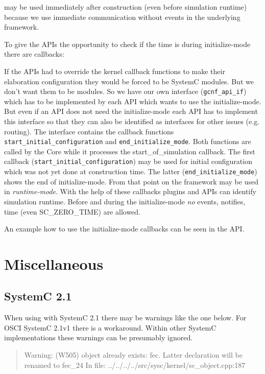 \GreenControl may be used immediately after construction (even before simulation runtime) because we use immediate communication without events in the underlying \GreenBus framework.

To give the APIs the opportunity to check if the time is during initialize-mode there are callbacks:

If the APIs had to override the kernel callback functions to make their elaboration configuration
they would be forced to be SystemC modules. But we don't want them to be modules. So we have our own
interface (\lstinline|gcnf_api_if|) which has to be implemented by each API which wants to use the
initialize-mode. But even if an API does not need the initialize-mode each API has to implement this interface so that they can also be identified as interfaces for other issues (e.g. routing). The interface contains the callback functions
\lstinline|start_initial_configuration| and \lstinline|end_initialize_mode|. Both functions are called by the Core while it processes the start\_of\_simulation callback. The first callback (\lstinline|start_initial_configuration|) may be used for initial configuration which was not yet done at construction time. The latter (\lstinline|end_initialize_mode|) shows the end of initialize-mode. From that point on the framework may be used in {\em runtime-mode}. With the help of these callbacks plugins and APIs can identify simulation runtime. Before and during the initialize-mode {\em no} events, notifies, time (even SC\_ZERO\_TIME) are allowed.

An example how to use the initialize-mode callbacks can be seen in the \GreenConfig API.


\section{Miscellaneous}
\label{GCMiscellaneous}

\subsection{SystemC 2.1}
When using \GreenControl with SystemC 2.1 there may be warnings like the one below. For OSCI SystemC 2.1v1 there is a workaround. Within other SystemC implementations these warnings can be presumably ignored. \newline
\begin{quote}
{\sffamily Warning: (W505) object already exists: fec. Latter declaration will be renamed to fec\_24 \newline
In file: ../../../../src/sysc/kernel/sc\_object.cpp:187} \newline
\end{quote}


